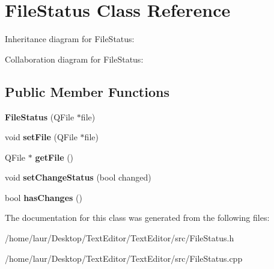 \hypertarget{class_file_status}{}\section{File\+Status Class Reference}
\label{class_file_status}


Inheritance diagram for File\+Status\+:


Collaboration diagram for File\+Status\+:
\subsection*{Public Member Functions}
\begin{DoxyCompactItemize}
\item 
\mbox{\label{class_file_status_a318fe629d443859d11d9759571c98021}} 
{\bfseries File\+Status} (Q\+File $\ast$file)
\item 
\mbox{\label{class_file_status_ad57e83607307f1d07c19de53b90c38d1}} 
void {\bfseries set\+File} (Q\+File $\ast$file)
\item 
\mbox{\label{class_file_status_a6b33391dd4774e34f91e30e06ed1677d}} 
Q\+File $\ast$ {\bfseries get\+File} ()
\item 
\mbox{\label{class_file_status_a60ff73337c07fd4327deeee7b6689073}} 
void {\bfseries set\+Change\+Status} (bool changed)
\item 
\mbox{\label{class_file_status_ac76c8fe88e317b55090960227ab2a33b}} 
bool {\bfseries has\+Changes} ()
\end{DoxyCompactItemize}


The documentation for this class was generated from the following files\+:\begin{DoxyCompactItemize}
\item 
/home/laur/\+Desktop/\+Text\+Editor/\+Text\+Editor/src/File\+Status.\+h\item 
/home/laur/\+Desktop/\+Text\+Editor/\+Text\+Editor/src/File\+Status.\+cpp\end{DoxyCompactItemize}
